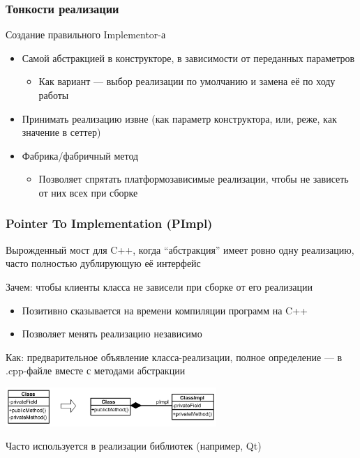 \documentclass{../../slides-style}
\begin{document}
    \begin{frame}
        \frametitle{Тонкости реализации}
        Создание правильного Implementor-а
        \begin{itemize}
            \item Самой абстракцией в конструкторе, в зависимости от переданных параметров
            \begin{itemize}
                \item Как вариант --- выбор реализации по умолчанию и замена её по ходу работы
            \end{itemize}
            \item Принимать реализацию извне (как параметр конструктора, или, реже, как значение в сеттер)
            \item Фабрика/фабричный метод
            \begin{itemize}
                \item Позволяет спрятать платформозависимые реализации, чтобы не зависеть от них всех при сборке
            \end{itemize}
        \end{itemize}
    \end{frame}

    \begin{frame}
        \frametitle{Pointer To Implementation (PImpl)}
        Вырожденный мост для C++, когда ``абстракция'' имеет ровно одну реализацию, часто полностью дублирующую её интерфейс

        Зачем: чтобы клиенты класса не зависели при сборке от его реализации

        \begin{itemize}
            \item Позитивно сказывается на времени компиляции программ на C++
            \item Позволяет менять реализацию независимо
        \end{itemize}

        Как: предварительное объявление класса-реализации, полное определение --- в .cpp-файле вместе с методами абстракции

        \begin{center}
            \includegraphics[width=0.6\textwidth]{pImpl.png}
        \end{center}

        Часто используется в реализации библиотек (например, Qt)
    \end{frame}
\end{document}
